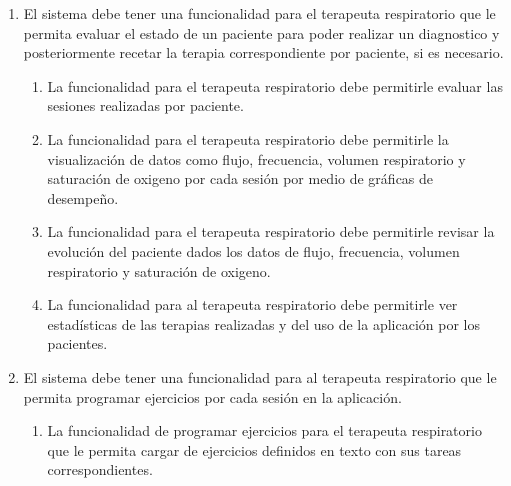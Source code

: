 \documentclass[12pt]{article}
\begin{document}
\begin{enumerate}[start=1,label={\bfseries RF0\arabic*.}]

    \item El sistema debe tener una funcionalidad para el terapeuta respiratorio que le permita evaluar el estado de un paciente para poder realizar un diagnostico y posteriormente recetar la terapia correspondiente por paciente, si es necesario.
        \label{RF01}
            \begin{enumerate}[label*=\arabic*.]
                \item La funcionalidad para el terapeuta respiratorio debe permitirle evaluar las sesiones realizadas por paciente.
                
                \item La funcionalidad para el terapeuta respiratorio debe permitirle la visualización de datos como flujo, frecuencia, volumen respiratorio y saturación de oxigeno por cada sesión por medio de gráficas de desempeño.
                
                \item La funcionalidad para el terapeuta respiratorio debe permitirle revisar la evolución del paciente dados los datos de flujo, frecuencia, volumen respiratorio y saturación de oxigeno.  %
                
                \item La funcionalidad para al terapeuta respiratorio debe permitirle ver estadísticas de las terapias realizadas y del uso de la aplicación por los pacientes. %
                
              
            \end{enumerate}

    \item El sistema debe tener una funcionalidad para al terapeuta respiratorio que le permita programar  ejercicios por cada sesión en la aplicación.
        
        \label{RF01}
            \begin{enumerate}[label*=\arabic*.]
            
                \item La funcionalidad de programar ejercicios para el terapeuta respiratorio que le permita cargar de ejercicios definidos en texto con sus tareas correspondientes. %
                 

\end{enumerate}
\end{enumerate}
\end{document}
